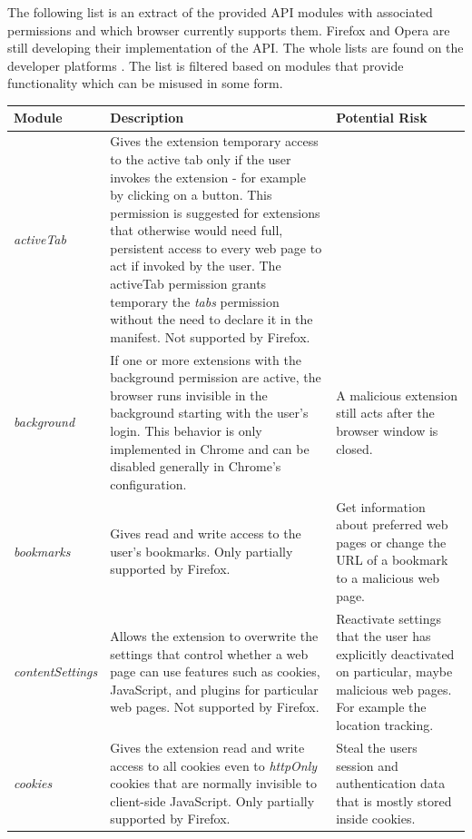 \documentclass[article,colorback,accentcolor=tud9c,type=bsc]{tudthesis}
\begin{document}
	The following list is an extract of the provided API modules with associated permissions and which browser currently supports them. Firefox and Opera are still developing their implementation of the API. The whole lists are found on the developer platforms \cite{chromeDevApiList, operaDevApiList, mozillaDevApiList}. The list is filtered based on modules that provide functionality which can be misused in some form. \\
	
	\renewcommand{\arraystretch}{1.5}
	\begin{tabular}{lp{}p{}}
		\textbf{Module} & \textbf{Description} & \textbf{Potential Risk} \\ 
		\hline
		
		\textit{activeTab} & Gives the extension temporary access to the active tab only if the user invokes the extension - for example by clicking on a button. This permission is suggested for extensions that otherwise would need full, persistent access to every web page to act if invoked by the user. The activeTab permission grants temporary the \textit{tabs} permission without the need to declare it in the manifest. Not supported by Firefox. &  \\
		
		\textit{background} & If one or more extensions with the background permission are active, the browser runs invisible in the background starting with the user's login. This behavior is only implemented in Chrome and can be disabled generally in Chrome's configuration. & A malicious extension still acts after the browser window is closed. \\
		
		\textit{bookmarks} & Gives read and write access to the user's bookmarks. Only partially supported by Firefox. & Get information about preferred web pages or change the URL of a bookmark to a malicious web page. \\
		
		\textit{contentSettings} &	Allows the extension to overwrite the settings that control whether a web page can use features such as cookies, JavaScript, and plugins for particular web pages. Not supported by Firefox. & Reactivate settings that the user has explicitly deactivated on particular, maybe malicious web pages. For example the location tracking. \\
		
		\textit{cookies} & Gives the extension read and write access to all cookies even to \textit{httpOnly} cookies that are normally invisible to client-side JavaScript. Only partially supported by Firefox. & Steal the users session and authentication data that is mostly stored inside cookies. \\
		

\end{tabular}
\end{document}
